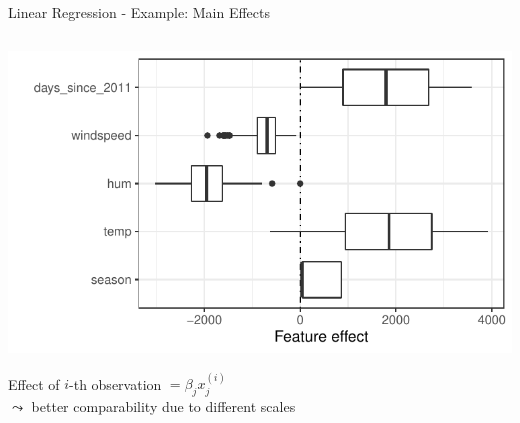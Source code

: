 \documentclass[11pt,compress,t,notes=noshow, aspectratio=169, xcolor=table]{beamer}
\begin{document}
\begin{frame}{Linear Regression - Example: Main Effects}
\begin{columns}[T]
\begin{column}{0.47\textwidth}
  \includegraphics[width = \textwidth]{slides/interpretable-models/figure/plot_lin_effect.pdf}
  \begin{center}
    Effect of $i$-th observation $= \beta_j x_j^{(i)}$\\
    $\leadsto$ better comparability due to different scales
  \end{center}
   
\end{column}
\end{columns}
\end{frame}
\end{document}
